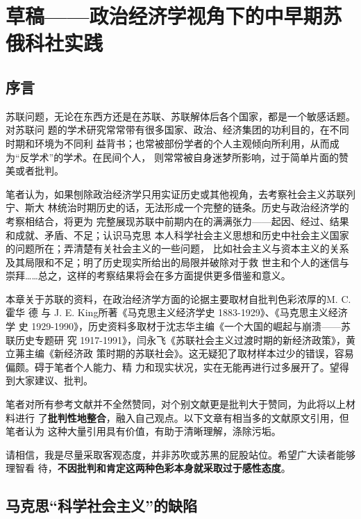 \chapter[中早期苏俄科社实践]{草稿——政治经济学视角下的中早期苏俄科社实践}
\label{chap:russiachina}

\section{序言}

苏联问题，无论在东西方还是在苏联、苏联解体后各个国家，都是一个敏感话题。对苏联问
题的学术研究常常带有很多国家、政治、经济集团的功利目的，在不同时期和环境为不同利
益背书；也常被部份学者的个人主观倾向所利用，从而成为“反学术”的学术。在民间个人，
则常常被自身迷梦所影响，过于简单片面的赞美或者批判。

笔者认为，如果刨除政治经济学只用实证历史或其他视角，去考察社会主义苏联列宁、斯大
林统治时期历史的话，无法形成一个完整的链条。历史与政治经济学的考察相结合，将更为
完整展现苏联中前期内在的满满张力——起因、经过、结果和成就、矛盾、不足；认识马克思
本人科学社会主义思想和历史中社会主义国家的问题所在；弄清楚有关社会主义的一些问题，
比如社会主义与资本主义的关系及其局限和不足；明了历史现实所给出的局限并破除对于救
世主和个人的迷信与崇拜……总之，这样的考察结果将会在多方面提供更多借鉴和意义。

本章关于苏联的资料，在政治经济学方面的论据主要取材自批判色彩浓厚的M. C. 霍华
德 与 J. E. King所著《马克思主义经济学史 1883-1929》、《马克思主义经济学
史 1929-1990》，历史资料多取材于沈志华主编《一个大国的崛起与崩溃——苏联历史专题研
究 1917-1991》，闫永飞《苏联社会主义过渡时期的新经济政策》，黄立茀主编《新经济政
策时期的苏联社会》。这无疑犯了取材样本过少的错误，容易偏颇。碍于笔者个人能力、精
力和现实状况，实在无能再进行过多展开了。望得到大家建议、批判。

笔者对所有参考文献并不全然赞同，对个别文献更是批判大于赞同，为此将以上材料进行
了\textbf{批判性地整合}，融入自己观点。以下文章有相当多的文献原文引用，但笔者认为
这种大量引用具有价值，有助于清晰理解，涤除污垢。

请相信，我是尽量采取客观态度，并非苏吹或苏黑的屁股站位。希望广大读者能够理智看
待，\textbf{不因批判和肯定这两种色彩本身就采取过于感性态度}。

\section{马克思“科学社会主义”的缺陷}
\label{sec:marxkexue}

